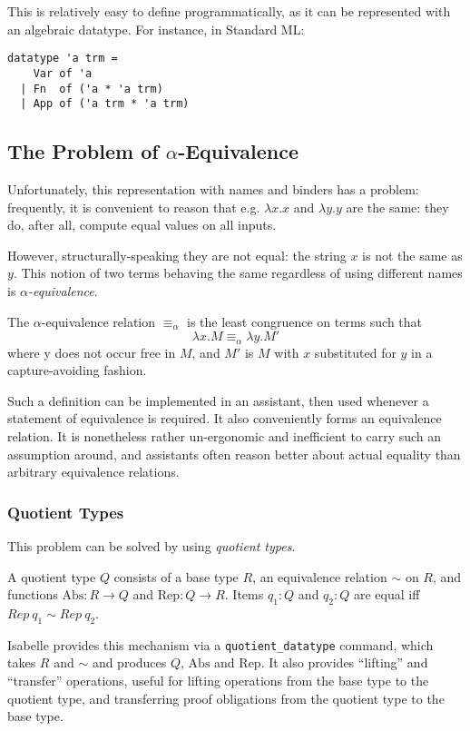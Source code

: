 This is relatively easy to define programmatically, as it can be represented with an algebraic datatype.
For instance, in Standard ML:
\begin{verbatim}
datatype 'a trm =
    Var of 'a
  | Fn  of ('a * 'a trm)
  | App of ('a trm * 'a trm)
\end{verbatim}

\subsection{The Problem of \(\alpha\)-Equivalence}
Unfortunately, this representation with names and binders has a problem: frequently, it is convenient to reason that e.g. \(\lambda x.x\) and \(\lambda y.y\) are the same: they do, after all, compute equal values on all inputs.

However, structurally-speaking they are not equal: the string \(x\) is not the same as \(y\).
This notion of two terms behaving the same regardless of using different names is \emph{\(\alpha\)-equivalence}.
\begin{definition}
The \(\alpha\)-equivalence relation \(\equiv_\alpha\) is the least congruence on terms such that
\[
\lambda x.M \equiv_\alpha \lambda y.M'
\]
where y does not occur free in \(M\), and \(M'\) is \(M\) with \(x\) substituted for \(y\) in a capture-avoiding fashion.
\end{definition}

Such a definition can be implemented in an assistant, then used whenever a statement of equivalence is required.
It also conveniently forms an equivalence relation.
It is nonetheless rather un-ergonomic and inefficient to carry such an assumption around, and assistants often reason better about actual equality than arbitrary equivalence relations.

\subsubsection{Quotient Types}
This problem can be solved by using \emph{quotient types}.
\begin{definition}
A quotient type \(Q\) consists of a base type \(R\), an equivalence relation \(\sim\) on \(R\), and functions \(\mathrm{Abs} : R \to Q\) and \(\mathrm{Rep} : Q \to R\).
Items \(q_1 : Q\) and \(q_2 : Q\) are equal iff \(Rep\ q_1 \sim Rep\ q_2\).
\end{definition}
Isabelle provides this mechanism via a \texttt{quotient\_datatype} command\cite{isabelle-quotient}, which takes \(R\) and \(\sim\) and produces \(Q\), \(\mathrm{Abs}\) and \(\mathrm{Rep}\).
It also provides ``lifting'' and ``transfer'' operations, useful for lifting operations from the base type to the quotient type, and transferring proof obligations from the quotient type to the base type.

